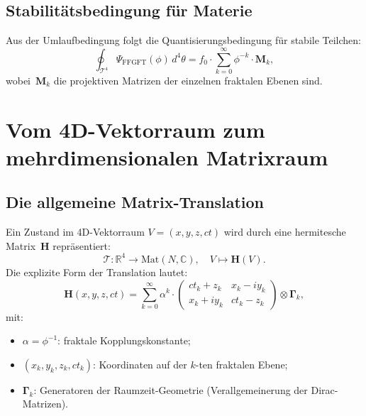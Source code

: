 \subsection{Stabilitätsbedingung für Materie}

Aus der Umlaufbedingung folgt die Quantisierungsbedingung für stabile Teilchen:
\begin{equation}
  \oint_{\mathcal{T}^4}
    \Psi_{\text{FFGFT}}(\phi)\,d^4\theta
  = f_0 \cdot \sum_{k=0}^{\infty} \phi^{-k} \cdot \mathbf{M}_k,
\end{equation}
wobei~$\mathbf{M}_k$ die projektiven Matrizen der einzelnen fraktalen
Ebenen sind.

\section{Vom 4D-Vektorraum zum mehrdimensionalen Matrixraum}

\subsection{Die allgemeine Matrix-Translation}

Ein Zustand im 4D-Vektorraum $V = (x,y,z,ct)$ wird durch eine hermitesche
Matrix~$\mathbf{H}$ repräsentiert:
\begin{equation}
  \mathcal{T}: \mathbb{R}^4 \to \mathrm{Mat}(N,\mathbb{C}),\quad
  V \mapsto \mathbf{H}(V).
\end{equation}
Die explizite Form der Translation lautet:
\begin{equation}
  \mathbf{H}(x,y,z,ct)
  = \sum_{k=0}^{\infty} \alpha^k \cdot
    \begin{pmatrix}
      ct_k + z_k   & x_k - iy_k \\
      x_k + iy_k   & ct_k - z_k
    \end{pmatrix}
    \otimes \symbf{\Gamma}_k,
\end{equation}
mit:
\begin{itemize}
  \item $\alpha = \phi^{-1}$: fraktale Kopplungskonstante;
  \item $(x_k, y_k, z_k, ct_k)$: Koordinaten auf der $k$-ten fraktalen Ebene;
  \item $\symbf{\Gamma}_k$: Generatoren der Raumzeit-Geometrie
        (Verallgemeinerung der Dirac-Matrizen).
\end{itemize}

